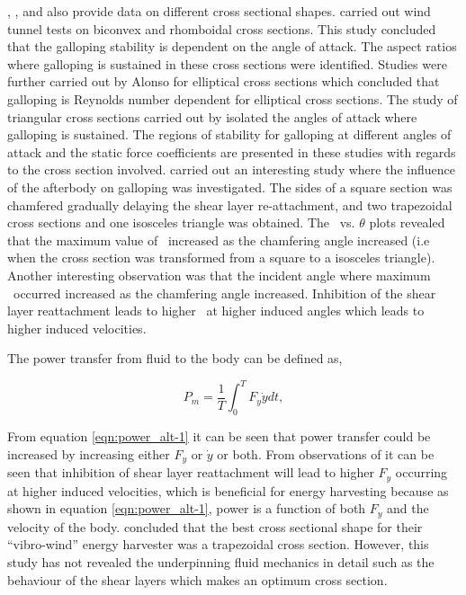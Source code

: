  
\citet{Naudascher1993}, \citet{Ruscheweyh1996}, \citet{Deniz1997} and \citet{Weaver2005} also provide data on different cross sectional shapes. \citet{Alonso2009} carried out wind tunnel tests on biconvex and rhomboidal cross sections. This study concluded that the galloping stability is dependent on the angle of attack. The aspect ratios where galloping is sustained in these cross sections were identified. Studies were further carried out by Alonso for elliptical cross sections \citep{Alonso2010} which concluded that galloping is Reynolds number dependent for elliptical cross sections. The study of triangular cross sections carried out by \citep{Alonso2005} isolated the angles of attack where galloping is sustained. The regions of stability for galloping at different angles of attack and the static force coefficients are presented in these studies with regards to the cross section involved. \citet{Luo1994} carried out an interesting study where the influence of the afterbody on galloping was investigated. The sides of a square section was chamfered gradually delaying the shear layer re-attachment, and two trapezoidal cross sections and one isosceles triangle was obtained. The \cy\ vs. $\theta$ plots revealed that the maximum value of \cy\ increased as the chamfering angle increased (i.e when the cross section was transformed from a square to a isosceles triangle). Another interesting observation was that the incident angle where maximum \cy\ occurred increased as the chamfering angle increased. Inhibition of the shear layer reattachment leads to higher \cy\ at higher induced angles which leads to higher induced velocities. 

The power transfer from fluid to the body can be defined as,

\begin{equation}
\label{eqn:power_alt-1}
P_{m}=\frac{1}{T}\int_{0}^{T}F_y\dot{y} dt,
\end{equation}

From equation \ref{eqn:power_alt-1} it can be seen that power transfer could be increased by increasing either $F_{y}$ or $\dot{y}$ or both. From observations of \citet{Luo1994} it can be seen that inhibition of shear layer reattachment will lead to higher $F_{y}$ occurring at higher induced velocities, which is beneficial for energy harvesting because as shown in equation \ref{eqn:power_alt-1}, power is a function of both $F_{y}$ and the velocity of the body. \citet{Kluger2013} concluded that the best cross sectional shape for their ``vibro-wind'' energy harvester was a trapezoidal cross section. However, this study has not revealed the underpinning fluid mechanics in detail such as the behaviour of the shear layers which makes an optimum cross section.

